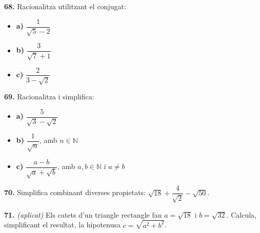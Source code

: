 \documentclass[13pt,a4paper]{extarticle}
\begin{document}
\par\noindent\begin{minipage}{\linewidth}
\textbf{68.} Racionalitza utilitzant el conjugat:\par

\begin{itemize}[leftmargin=0pt,itemsep=3pt,topsep=3pt,parsep=0pt,label={}]
\item \textbf{a)} $\dfrac{1}{\sqrt5-2}$
\item \textbf{b)} $\dfrac{3}{\sqrt7+1}$
\item \textbf{c)} $\dfrac{2}{3-\sqrt2}$
\end{itemize}
\end{minipage}\par\vspace{1.6mm}
\par\noindent\begin{minipage}{\linewidth}
\textbf{69.} Racionalitza i simplifica:\par

\begin{itemize}[leftmargin=0pt,itemsep=3pt,topsep=3pt,parsep=0pt,label={}]
\item \textbf{a)} $\dfrac{5}{\sqrt3-\sqrt2}$
\item \textbf{b)} $\dfrac{1}{\sqrt{n}}$, amb $n\in\mathbb{N}$
\item \textbf{c)} $\dfrac{a-b}{\sqrt{a}+\sqrt{b}}$, amb $a,b\in\mathbb{N}$ i $a\neq b$
\end{itemize}
\end{minipage}\par\vspace{1.6mm}
\par\noindent\begin{minipage}{\linewidth}
\textbf{70.} Simplifica combinant diverses propietats: $\sqrt{18}+\dfrac{4}{\sqrt2}-\sqrt{50}$.\par
\end{minipage}\par\vspace{1.6mm}
\par\noindent\begin{minipage}{\linewidth}
\textbf{71.} \emph{(aplicat)} Els catets d'un triangle rectangle fan $a=\sqrt{18}$ i $b=\sqrt{32}$. Calcula, simplificant el resultat, la hipotenusa $c=\sqrt{a^2+b^2}$.\par
\end{minipage}\par\vspace{1.6mm}
\end{document}
